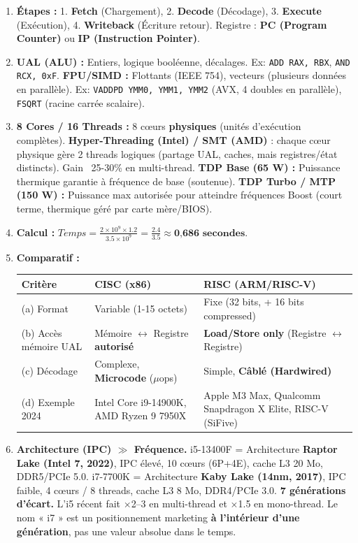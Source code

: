 \documentclass[11pt]{article}
\begin{document}
\begin{corrige}[Exercice n]
\begin{enumerate}
    \item \textbf{Étapes :} 1. \textbf{Fetch} (Chargement), 2. \textbf{Decode} (Décodage), 3. \textbf{Execute} (Exécution), 4. \textbf{Writeback} (Écriture retour). Registre : \textbf{PC (Program Counter)} ou \textbf{IP (Instruction Pointer)}.
    \item \textbf{UAL (ALU) :} Entiers, logique booléenne, décalages. Ex: \texttt{ADD RAX, RBX}, \texttt{AND RCX, 0xF}. \textbf{FPU/SIMD :} Flottants (IEEE 754), vecteurs (plusieurs données en parallèle). Ex: \texttt{VADDPD YMM0, YMM1, YMM2} (AVX, 4 doubles en parallèle), \texttt{FSQRT} (racine carrée scalaire).
    \item \textbf{8 Cores / 16 Threads :} 8 cœurs \textbf{physiques} (unités d'exécution complètes). \textbf{Hyper-Threading (Intel) / SMT (AMD)} : chaque cœur physique gère 2 threads logiques (partage UAL, caches, mais registres/état distincts). Gain ~25-30\% en multi-thread. \textbf{TDP Base (65 W) :} Puissance thermique garantie à fréquence de base (soutenue). \textbf{TDP Turbo / MTP (150 W) :} Puissance max autorisée pour atteindre fréquences Boost (court terme, thermique géré par carte mère/BIOS).
    \item \textbf{Calcul :} $Temps = \frac{2 \times 10^9 \times 1.2}{3.5 \times 10^9} = \frac{2.4}{3.5} \approx \textbf{0,686 secondes}$.
    \item \textbf{Comparatif :}
    \begin{center}
    \begin{tabularx}{\linewidth}{|l|X|X|}
    \hline
    \rowcolor{popblueL} \textbf{Critère} & \textbf{CISC (x86)} & \textbf{RISC (ARM/RISC-V)} \\ \hline
    (a) Format & Variable (1-15 octets) & Fixe (32 bits, + 16 bits compressed) \\ \hline
    (b) Accès mémoire UAL & Mémoire $\leftrightarrow$ Registre \textbf{autorisé} & \textbf{Load/Store only} (Registre $\leftrightarrow$ Registre) \\ \hline
    (c) Décodage & Complexe, \textbf{Microcode} ($\mu$ops) & Simple, \textbf{Câblé (Hardwired)} \\ \hline
    (d) Exemple 2024 & Intel Core i9-14900K, AMD Ryzen 9 7950X & Apple M3 Max, Qualcomm Snapdragon X Elite, RISC-V (SiFive) \\ \hline
    \end{tabularx}
    \end{center}
    \item \textbf{Architecture (IPC) $\gg$ Fréquence.} i5-13400F = Architecture \textbf{Raptor Lake (Intel 7, 2022)}, IPC élevé, 10 cœurs (6P+4E), cache L3 20 Mo, DDR5/PCIe 5.0. i7-7700K = Architecture \textbf{Kaby Lake (14nm, 2017)}, IPC faible, 4 cœurs / 8 threads, cache L3 8 Mo, DDR4/PCIe 3.0. \textbf{7 générations d'écart.} L'i5 récent fait $\times$2--3 en multi-thread et $\times$1.5 en mono-thread. Le nom « i7 » est un positionnement marketing \textbf{à l'intérieur d'une génération}, pas une valeur absolue dans le temps.
\end{enumerate}
\end{corrige}
\end{document}
